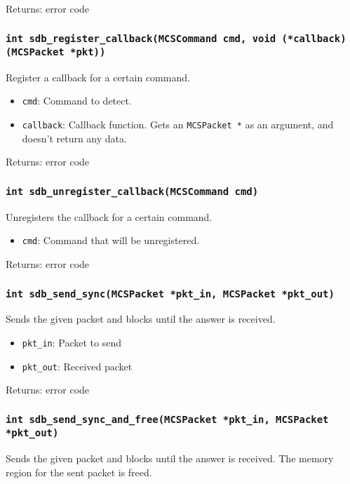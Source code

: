 \documentclass[12pt,a4paper]{report}
\begin{document}
Returns: error code

\subsubsection*{\texttt{int sdb\_register\_callback(MCSCommand cmd, void (*callback)(MCSPacket *pkt))}}
Register a callback for a certain command.

\begin{itemize}
\item \texttt{cmd}: Command to detect.
\item \texttt{callback}: Callback function. Gets an \texttt{MCSPacket *} as an argument, and doesn't return any data.
\end{itemize}

Returns: error code

\subsubsection*{\texttt{int sdb\_unregister\_callback(MCSCommand cmd)}}
Unregisters the callback for a certain command.

\begin{itemize}
\item \texttt{cmd}: Command that will be unregistered.
\end{itemize}

Returns: error code

\subsubsection*{\texttt{int sdb\_send\_sync(MCSPacket *pkt\_in, MCSPacket *pkt\_out)}}
Sends the given packet and blocks until the answer is received.

\begin{itemize}
\item \texttt{pkt\_in}: Packet to send
\item \texttt{pkt\_out}: Received packet
\end{itemize}

Returns: error code

\subsubsection*{\texttt{int sdb\_send\_sync\_and\_free(MCSPacket *pkt\_in, MCSPacket *pkt\_out)}}
Sends the given packet and blocks until the answer is received. The memory region for the sent packet is freed.
\end{document}
